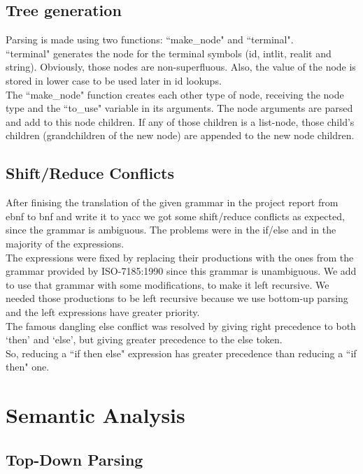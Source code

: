 \documentclass[12pt]{article}
\begin{document}
\subsection{Tree generation}

Parsing is made using two functions: ``make\_node" and ``terminal". \\
``terminal" generates the node for the terminal symbols (id, intlit, realit and string). Obviously, those nodes are non-superfluous. Also, the value of the node is stored in lower case to be used later in id lookups.\\
The ``make\_node" function creates each other type of node, receiving the node type and the ``to\_use" variable in its arguments. The node arguments are parsed and add to this node children. If any of those children is a list-node, those child's children (grandchildren of the new node) are appended to the new node children.\\

\subsection{Shift/Reduce Conflicts}

After finising the translation of the given grammar in the project report from ebnf to bnf and write it to yacc we got some shift/reduce conflicts as expected, since the grammar is ambiguous. The problems were in the if/else and in the majority of the expressions. \\
The expressions were fixed by replacing their productions with the ones from the grammar provided by ISO-7185:1990 since this grammar is unambiguous. We add to use that grammar with some modifications, to make it left recursive. We needed those productions to be left recursive because we use bottom-up parsing and the left expressions have greater priority.\\
The famous dangling else conflict was resolved by giving right precedence to both `then' and `else', but giving greater precedence to the else token. \\
So, reducing a ``if then else" expression has greater precedence than reducing a ``if then" one. \\


\section{Semantic Analysis}


\subsection{Top-Down Parsing}
\end{document}
